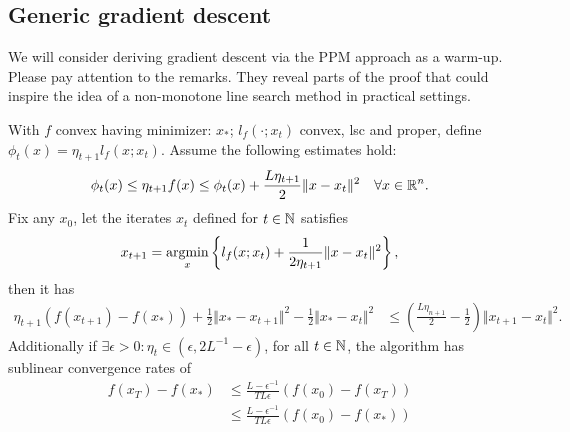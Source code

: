 \documentclass[12pt]{article}
\begin{document}
    \subsection{Generic gradient descent}
        We will consider deriving gradient descent via the PPM approach as a warm-up. 
        Please pay attention to the remarks. They reveal parts of the proof that could inspire the idea of a non-monotone line search method in practical settings. 
        \begin{theorem}\label{thm:lower_approx_ppm_convergence}
            With $f$ convex having minimizer: $x_*$; $l_f(\cdot; x_t)$ convex, lsc and proper, define $\phi_t(x) = \eta_{t + 1}l_f(x; x_t)$. 
            Assume the following estimates hold: 
            $$
            \phi_t(x) \le \eta_{t + 1}f(x) \le \phi_t(x) 
            + 
            \frac{L\eta_{t + 1}}{2}\Vert x - x_t\Vert^2 \quad \forall x \in \mathbb R^n. 
            $$ 
            Fix any $x_0$, let the iterates $x_t$ defined for $t\in \mathbb N$ satisfies
            \begin{align*}
                x_{t +1} = \mathop{\rm argmin}\limits_{x} \left\lbrace
                    l_f(x; x_t) + \frac{1}{2\eta_{t + 1}}\Vert x - x_t\Vert^2
                \right\rbrace, 
            \end{align*}
            then it has 
            \begin{align*}
                \eta_{t + 1}(f(x_{t + 1}) - f(x_*)) + \frac{1}{2}\Vert x_* - x_{t + 1}\Vert^2
                - \frac{1}{2}\Vert x_* - x_t\Vert^2
                & \le 
                \left(
                    \frac{L \eta_{n + 1}}{2} - \frac{1}{2}
                \right)\Vert x_{t + 1} - x_t\Vert^2.
            \end{align*}
            Additionally if $\exists \epsilon > 0: \eta_{t} \in (\epsilon, 2L^{-1} - \epsilon)$, for all $t \in \mathbb N$, the algorithm has sublinear convergence rates of
            \begin{align*}
                f(x_T) - f(x_*)
                &\le 
                \frac{L - \epsilon^{-1}}{TL\epsilon} (f(x_0) - f(x_T)) 
                \\
                &\le 
                \frac{L - \epsilon^{-1}}{TL\epsilon} (f(x_0) - f(x_*)) 
            \end{align*}
        \end{theorem}
\end{document}
